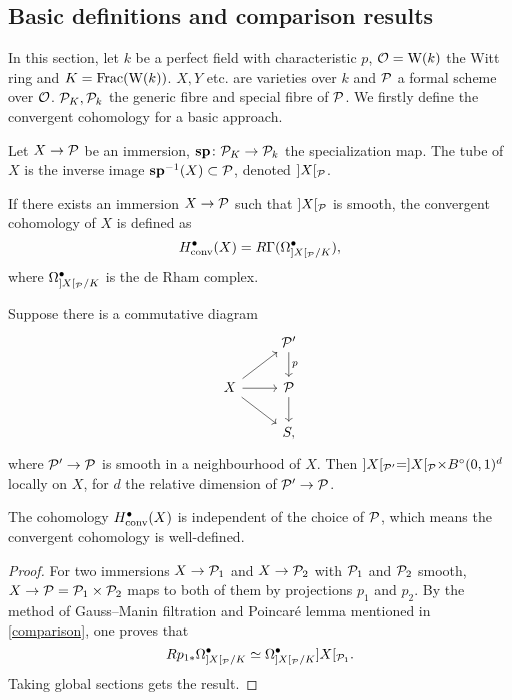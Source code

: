 \subsection{Basic definitions and comparison results}
In this section, let $k$ be a perfect field with characteristic $p$, 
${\mathcal {O}} = \mathrm{W}(k)$ the Witt ring and $K = \operatorname{Frac}(\mathrm{W}(k))$. 
$X, Y$ etc. are varieties over $k$ and 
${\mathcal {P}}$ a formal scheme over ${\mathcal {O}}$. 
${\mathcal {P}}_K, {\mathcal {P}}_k$ the generic fibre and special fibre of ${\mathcal {P}}$.
We firstly define the convergent cohomology for a basic approach.
\begin{definition}
    Let $X \to {\mathcal {P}}$ be an immersion, 
    $\mathbf{sp} \colon {\mathcal {P}}_K \to {\mathcal {P}}_k$ the specialization map. 
    The tube of $X$ is the inverse image $\mathbf{sp}^{-1}(X) \subset {\mathcal {P}}$, denoted $]X[_{\mathcal {P}}$.
\end{definition}

\begin{definition}
    If there exists an immersion $X \to {\mathcal {P}}$ such that 
    $]X[_{\mathcal {P}}$ is smooth, the convergent cohomology of $X$ is defined as
    \[
        H^\bullet_{\mathrm{conv}}(X) = R\Gamma(\Omega_{]X[_{\mathcal {P}}/K}^\bullet),
    \]
    where $\Omega_{]X[_{\mathcal {P}}/K}^\bullet$ is the de Rham complex.
\end{definition}

\begin{proposition}
    Suppose there is a commutative diagram 
    \[
        \begin{tikzcd}
            & \CP'\ar[d, "p"]\\
            X \ar[r] \ar[ur] \ar[dr] & \CP \ar[d] \\
            & S,
        \end{tikzcd}
    \]
    where ${\mathcal {P}}' \to {\mathcal {P}}$ is smooth in a neighbourhood of $X$. 
    Then $]X[_{{\mathcal {P}}'} = ]X[_{{\mathcal {P}}} \times B^\circ(0,1)^d$ locally on $X$, 
    for $d$ the relative dimension of ${\mathcal {P}}' \to {\mathcal {P}}$.
\end{proposition}

\begin{proposition}
    The cohomology $H^\bullet_{\mathrm{conv}}(X)$ is independent of the choice of ${\mathcal {P}}$, 
    which means the convergent cohomology is well-defined. 
\end{proposition}

\begin{proof}
    For two immersions $X \to {\mathcal {P}}_1$ and $X\to {\mathcal {P}}_2$ with ${\mathcal {P}}_1$ and ${\mathcal {P}}_2$ smooth, 
    $X \to {\mathcal {P}} = {\mathcal {P}}_1 \times {\mathcal {P}}_2$ maps to both of them by projections $p_1$ and $p_2$. 
    By the method of Gauss--Manin filtration and 
    Poincar\'e lemma mentioned in \ref{comparison}, 
    one proves that
    \[
        Rp_{1*} \Omega_{]X[_{\mathcal {P}}/K}^\bullet \simeq \Omega_{]X[_{\mathcal {P}}/K}^\bullet ]X[_{{\mathcal {P}}_1}.
    \] 
    Taking global sections gets the result.
\end{proof}

